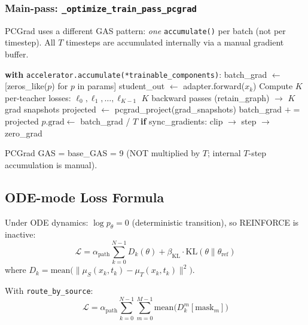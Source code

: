 \documentclass[11pt]{article}
\begin{document}
\subsubsection{Main-pass: \texttt{\_optimize\_train\_pass\_pcgrad}}

PCGrad uses a different GAS pattern: \emph{one} \texttt{accumulate()} per batch (not per timestep). All $T$ timesteps are accumulated internally via a manual gradient buffer.

\begin{algorithm}[H]
\caption{OPD Main-pass (PCGrad mode)}
\begin{algorithmic}
\STATE \textbf{with} \texttt{accelerator.accumulate(*trainable\_components)}: 
\STATE \quad batch\_grad $\leftarrow$ [zeros\_like($p$) for $p$ in params]
    \STATE \quad student\_out $\leftarrow$ adapter.forward($x_k$)
    \STATE \quad Compute $K$ per-teacher losses: $\ell_0, \ell_1, \ldots, \ell_{K-1}$
    \STATE \quad $K$ backward passes (retain\_graph) $\to$ $K$ grad snapshots
    \STATE \quad projected $\leftarrow$ pcgrad\_project(grad\_snapshots)
    \STATE \quad batch\_grad $\mathrel{+}=$ projected
\ENDFOR
\STATE \quad $p.\text{grad} \leftarrow$ batch\_grad / $T$
\STATE \textbf{if} sync\_gradients: clip $\to$ step $\to$ zero\_grad
\end{algorithmic}
\end{algorithm}

PCGrad GAS = base\_GAS = 9 (NOT multiplied by $T$; internal $T$-step accumulation is manual).

\subsection{ODE-mode Loss Formula}

Under ODE dynamics: $\log p_\theta = 0$ (deterministic transition), so REINFORCE is inactive:
\begin{equation}
\mathcal{L} = \alpha_\text{path} \sum_{k=0}^{N-1} D_k(\theta) + \beta_\text{KL} \cdot \text{KL}(\theta \| \theta_\text{ref})
\end{equation}
where $D_k = \text{mean}\bigl(\|\mu_S(x_k, t_k) - \mu_T(x_k, t_k)\|^2\bigr)$.

With \texttt{route\_by\_source}:
\begin{equation}
\mathcal{L} = \alpha_\text{path} \sum_{k=0}^{N-1} \sum_{m=0}^{M-1} \text{mean}\bigl(D_k^m[\text{mask}_m]\bigr)
\end{equation}
\end{document}
